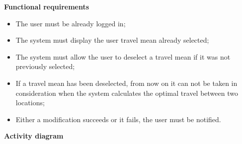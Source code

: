 \documentclass{article}
\begin{document}
	\bigskip
	\noindent
	\textbf{Functional requirements} \\
	\begin{itemize}
		\item The user must be already logged in;
		\item The system must display the user travel mean already selected;
		\item The system must allow the user to deselect a travel mean if it was not previously selected;
		\item If a travel mean has been deselected, from now on it can not be taken in consideration when the system calculates the optimal travel between two locations;
		\item Either a modification succeeds or it fails, the user must be notified.
	\end{itemize}
	
	\newpage
	\noindent
	\textbf{Activity diagram} \\
	
\end{document}
